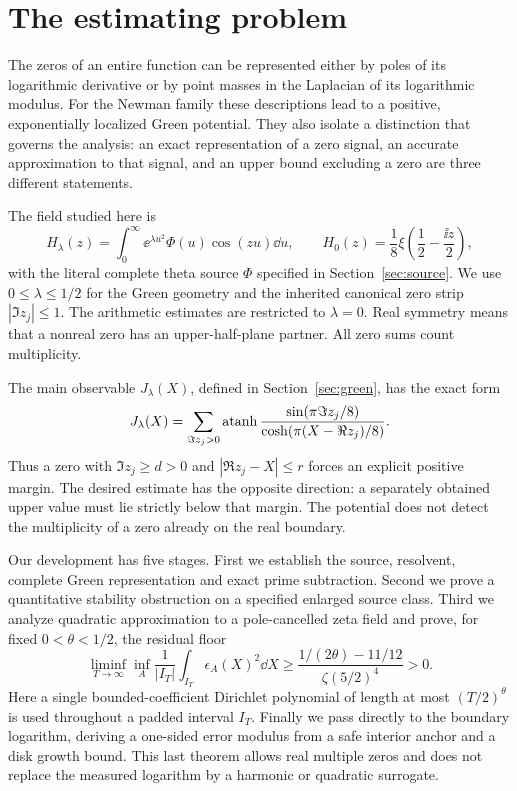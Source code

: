 \section{The estimating problem}\label{sec:introduction}

The zeros of an entire function can be represented either by poles of
its logarithmic derivative or by point masses in the Laplacian of its
logarithmic modulus. For the Newman family these descriptions lead to
a positive, exponentially localized Green potential. They also isolate
a distinction that governs the analysis: an exact representation of a
zero signal, an accurate approximation to that signal, and an upper
bound excluding a zero are three different statements.

The field studied here is
\[
 H_\lambda(z)=\int_0^\infty \ee^{\lambda u^2}\Phi(u)\cos(zu)\dd u,
 \qquad
 H_0(z)=\frac18\xi\left(\frac12-\frac{\ii z}{2}\right),
\]
with the literal complete theta source \(\Phi\) specified in
Section~\ref{sec:source}. We use \(0\le\lambda\le1/2\) for the Green
geometry and the inherited canonical zero strip \(|\Im z_j|\le1\).
The arithmetic estimates are restricted to \(\lambda=0\).
Real symmetry means that a nonreal zero has an upper-half-plane
partner. All zero sums count multiplicity.

The main observable \(J_\lambda(X)\), defined in
Section~\ref{sec:green}, has the exact form
\[
 J_\lambda(X)=\sum_{\Im z_j>0}
 \operatorname{atanh}\frac{\sin(\pi\Im z_j/8)}
               {\cosh(\pi(X-\Re z_j)/8)}.
\]
Thus a zero with \(\Im z_j\ge d>0\) and
\(|\Re z_j-X|\le r\) forces an explicit positive margin. The desired
estimate has the opposite direction: a separately obtained upper
value must lie strictly below that margin. The potential does not
detect the multiplicity of a zero already on the real boundary.

Our development has five stages. First we establish the source,
resolvent, complete Green representation and exact prime subtraction.
Second we prove a quantitative stability obstruction on a specified
enlarged source class. Third we analyze quadratic approximation to a
pole-cancelled zeta field and prove, for fixed \(0<\theta<1/2\),
the residual floor
\[
 \liminf_{T\to\infty}\inf_A
 \frac1{|I_T|}\int_{I_T}\epsilon_A(X)^2\dd X
 \ge\frac{1/(2\theta)-11/12}{\zeta(5/2)^4}>0.
\]
Here a single bounded-coefficient Dirichlet polynomial of length at
most \((T/2)^\theta\) is used throughout a padded interval \(I_T\).
Finally we pass directly to the boundary logarithm, deriving a
one-sided error modulus from a safe interior anchor and a disk
growth bound. This last theorem allows real multiple zeros and does
not replace the measured logarithm by a harmonic or quadratic
surrogate.

